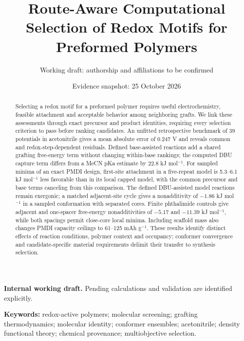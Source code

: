 \documentclass[11pt]{article}
\title{Route-Aware Computational Selection of Redox Motifs for Preformed Polymers}
\author{Working draft: authorship and affiliations to be confirmed}
\date{Evidence snapshot: 25 October 2026}
\begin{document}
\maketitle
\begin{center}\small\textbf{Internal working draft.} Pending calculations and validation are identified explicitly.\end{center}

\begin{abstract}
Selecting a redox motif for a preformed polymer requires useful electrochemistry, feasible attachment and acceptable behavior among neighboring grafts. We link these assessments through exact precursor and product identities, requiring every selection criterion to pass before ranking candidates. An unfitted retrospective benchmark of 39 potentials in acetonitrile gives a mean absolute error of 0.247 V and reveals common and redox-step-dependent residuals. Defined base-assisted reactions add a shared grafting free-energy term without changing within-base rankings; the computed DBU capture term differs from a MeCN pKa estimate by 22.8 kJ mol$^{-1}$. For sampled minima of an exact PMDI design, first-site attachment in a five-repeat model is 5.3--6.1 kJ mol$^{-1}$ less favorable than in its local capped model, with the common precursor and base terms canceling from this comparison. The defined DBU-assisted model reactions remain exergonic; a matched adjacent-site cycle gives a nonadditivity of $-1.86$ kJ mol$^{-1}$ in a sampled conformation with separated cores. Finite phthalimide controls give adjacent and one-spacer free-energy nonadditivities of $-5.17$ and $-11.39$ kJ mol$^{-1}$, while both spacings permit close-core local minima. Including scaffold mass also changes PMDI capacity ceilings to 61--125 mAh g$^{-1}$. These results identify distinct effects of reaction conditions, polymer context and occupancy; conformer convergence and candidate-specific material requirements delimit their transfer to synthesis selection.
\end{abstract}
\noindent\textbf{Keywords:} redox-active polymers; molecular screening; grafting thermodynamics; molecular identity; conformer ensembles; acetonitrile; density functional theory; chemical provenance; multiobjective selection.
\end{document}
